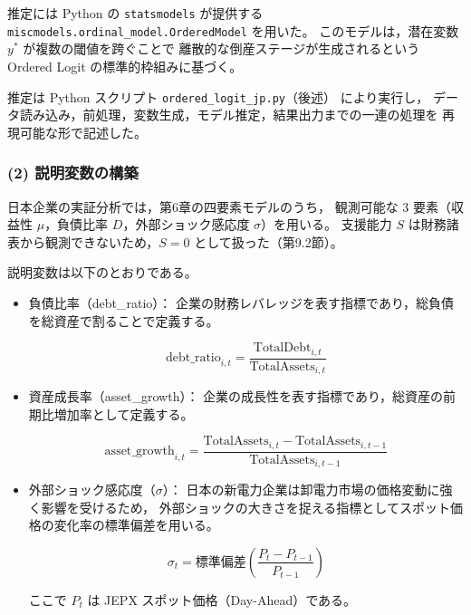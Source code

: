 推定には Python の \texttt{statsmodels} が提供する
\texttt{miscmodels.ordinal\_model.OrderedModel} を用いた。
このモデルは，潜在変数 $y^*$ が複数の閾値を跨ぐことで
離散的な倒産ステージが生成されるという Ordered Logit の標準的枠組みに基づく。

推定は Python スクリプト \texttt{ordered\_logit\_jp.py}（後述） により実行し，
データ読み込み，前処理，変数生成，モデル推定，結果出力までの一連の処理を
再現可能な形で記述した。

\subsubsection{(2) 説明変数の構築}

日本企業の実証分析では，第6章の四要素モデルのうち，
観測可能な 3 要素（収益性 $\mu$，負債比率 $D$，外部ショック感応度 $\sigma$）を用いる。
支援能力 $S$ は財務諸表から観測できないため，$S=0$ として扱った（第9.2節）。

説明変数は以下のとおりである。

\begin{itemize}
\item{負債比率（debt\_ratio）}：
企業の財務レバレッジを表す指標であり，総負債を総資産で割ることで定義する。



\[
\text{debt\_ratio}_{i,t}
=
\frac{\text{TotalDebt}_{i,t}}{\text{TotalAssets}_{i,t}}
\]

\end{itemize}
\begin{itemize}
\item{資産成長率（asset\_growth）}：
企業の成長性を表す指標であり，総資産の前期比増加率として定義する。



\[
\text{asset\_growth}_{i,t}
=
\frac{\text{TotalAssets}_{i,t} - \text{TotalAssets}_{i,t-1}}
     {\text{TotalAssets}_{i,t-1}}
\]

\end{itemize}
\begin{itemize}

\item{外部ショック感応度（$\sigma$）}：
日本の新電力企業は卸電力市場の価格変動に強く影響を受けるため，
外部ショックの大きさを捉える指標としてスポット価格の変化率の標準偏差を用いる。



\[
\sigma_t = \text{標準偏差}\left(\frac{P_t-P_{t-1}}{P_{t-1}}\right)
\]



ここで $P_t$ は JEPX スポット価格（Day-Ahead）である。
\end{itemize}

